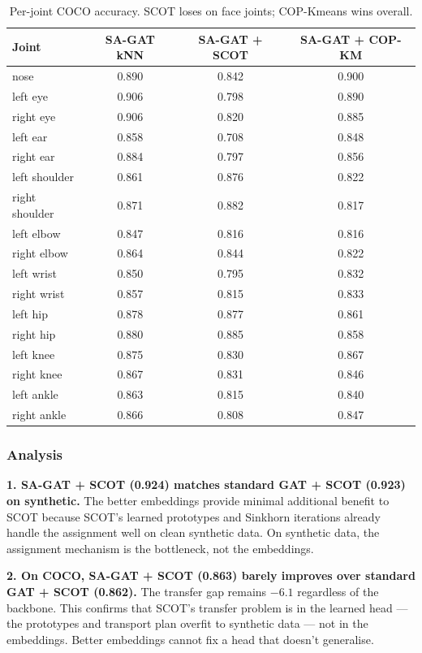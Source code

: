 \begin{table}[H]
\centering
\footnotesize
\begin{tabular}{lccc}
\toprule
Joint & SA-GAT kNN & SA-GAT + SCOT & SA-GAT + COP-KM \\
\midrule
nose & 0.890 & 0.842 & 0.900 \\
left eye & 0.906 & 0.798 & 0.890 \\
right eye & 0.906 & 0.820 & 0.885 \\
left ear & 0.858 & 0.708 & 0.848 \\
right ear & 0.884 & 0.797 & 0.856 \\
left shoulder & 0.861 & 0.876 & 0.822 \\
right shoulder & 0.871 & 0.882 & 0.817 \\
left elbow & 0.847 & 0.816 & 0.816 \\
right elbow & 0.864 & 0.844 & 0.822 \\
left wrist & 0.850 & 0.795 & 0.832 \\
right wrist & 0.857 & 0.815 & 0.833 \\
left hip & 0.878 & 0.877 & 0.861 \\
right hip & 0.880 & 0.885 & 0.858 \\
left knee & 0.875 & 0.830 & 0.867 \\
right knee & 0.867 & 0.831 & 0.846 \\
left ankle & 0.863 & 0.815 & 0.840 \\
right ankle & 0.866 & 0.808 & 0.847 \\
\bottomrule
\end{tabular}
\caption{Per-joint COCO accuracy. SCOT loses on face joints; COP-Kmeans wins overall.}
\end{table}


\subsubsection{Analysis}

\textbf{1. SA-GAT + SCOT (0.924) matches standard GAT + SCOT (0.923) on synthetic.} The better embeddings provide minimal additional benefit to SCOT because SCOT's learned prototypes and Sinkhorn iterations already handle the assignment well on clean synthetic data. On synthetic data, the assignment mechanism is the bottleneck, not the embeddings.

\textbf{2. On COCO, SA-GAT + SCOT (0.863) barely improves over standard GAT + SCOT (0.862).} The transfer gap remains $-6.1$ regardless of the backbone. This confirms that SCOT's transfer problem is in the learned head --- the prototypes and transport plan overfit to synthetic data --- not in the embeddings. Better embeddings cannot fix a head that doesn't generalise.

